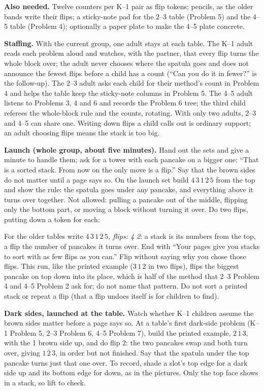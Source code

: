 \documentclass[11pt]{article}
\newcommand{\up}[1]{$\overline{#1}$}
\begin{document}
\textbf{Also needed.} Twelve counters per K--1 pair as flip tokens; pencils, as the older bands write their flips; a sticky-note pad for the 2--3 table (Problem 5) and the 4--5 table (Problem 4); optionally a paper plate to make the 4--5 plate concrete.

\textbf{Staffing.} With the current group, one adult stays at each table. The K--1 adult reads each problem aloud and watches, with the partner, that every flip turns the whole block over; the adult never chooses where the spatula goes and does not announce the fewest flips before a child has a count (``Can you do it in fewer?'' is the follow-up). The 2--3 adult asks each child for their method's count in Problem 4 and helps the table keep the sticky-note columns in Problem 5. The 4--5 adult listens to Problems 3, 4 and 6 and records the Problem 6 tree; the third child referees the whole-block rule and the counts, rotating. With only two adults, 2--3 and 4--5 can share one. Writing down flips a child calls out is ordinary support; an adult choosing flips means the stack is too big.

\textbf{Launch (whole group, about five minutes).} Hand out the sets and give a minute to handle them; ask for a tower with each pancake on a bigger one: ``That is a sorted stack. From now on the only move is a flip.'' Say that the brown sides do not matter until a page says so. On the launch set build $4\,3\,1\,2\,5$ from the top and show the rule: the spatula goes under any pancake, and everything above it turns over together. Not allowed: pulling a pancake out of the middle, flipping only the bottom part, or moving a block without turning it over. Do two flips, putting down a token for each:
\begin{center}\end{center}
For the older tables write \emph{$4\,3\,1\,2\,5$, flips: 4 2}: a stack is its numbers from the top, a flip the number of pancakes it turns over. End with ``Your pages give you stacks to sort with as few flips as you can.'' Flip without saying why you chose those flips. This run, like the printed example ($3\,1\,2$ in two flips), flips the biggest pancake on top down into its place, which is half of the method that 2--3 Problem 4 and 4--5 Problem 2 ask for; do not name that pattern. Do not sort a printed stack or repeat a flip (that a flip undoes itself is for children to find).

\textbf{Dark sides, launched at the table.} Watch whether K--1 children assume the brown sides matter before a page says so. At a table's first dark-side problem (K--1 Problem 5, 2--3 Problem 6, 4--5 Problem 7), build the printed example, $2$\,\up1\,$3$, with the 1 brown side up, and do flip 2: the two pancakes swap and both turn over, giving $1$\,\up2\,$3$, in order but not finished. Say that the spatula under the top pancake turns just that one over. To record, shade a slot's top edge for a dark side up and its bottom edge for down, as in the pictures. Only the top face shows in a stack, so lift to check.
\end{document}
